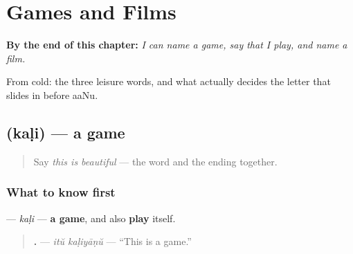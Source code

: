 
\chapter{Games and Films}
\label{ch:ml-leisure}

\begin{chapteropening}
\textbf{By the end of this chapter:} \emph{I can name a game, say that I play, and name a film.}

From cold: the three leisure words, and what actually decides the letter that slides in before aaNu.
\end{chapteropening}

\section[\texorpdfstring{\ml{കളി} (kaḷi)}{കളി (kaḷi)}]{ (kaḷi) — a game}

\label{lesson:ML-C98-kali}



\begin{quote}
Say \emph{this is beautiful} — the word and the ending together.
\end{quote}

\subsection*{What to know first}
\textbf{} — \emph{kaḷi} — \textbf{a game}, and also \textbf{play} itself.

\begin{quote}
\textbf{ .} — \emph{itŭ kaḷiyāṇŭ} — \textquotedblleft{}This is a game.\textquotedblright{}
\end{quote}

